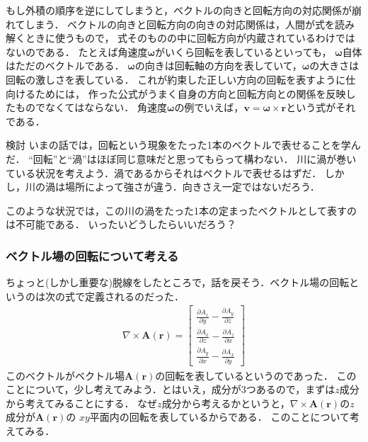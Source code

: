 もし外積の順序を逆にしてしまうと，ベクトルの向きと回転方向の対応関係が崩れてしまう．
ベクトルの向きと回転方向の向きの対応関係は，人間が式を読み解くときに使うもので，
式そのものの中に回転方向が内蔵されているわけではないのである．
たとえば角速度$\bm{\omega}$がいくら回転を表しているといっても，
$\bm{\omega}$自体はただのベクトルである．
$\bm{\omega}$の向きは回転軸の方向を表していて，$\bm{\omega}$の大きさは回転の激しさを表している．
これが約束した正しい方向の回転を表すように仕向けるためには，
作った公式がうまく自身の方向と回転方向との関係を反映したものでなくてはならない．
角速度$\bm{\omega}$の例でいえば，$\bm{v}=\bm{\omega}\times\bm{r}$という式がそれである．

\begin{itembox}[l]{検討}
いまの話では，回転という現象をたった1本のベクトルで表せることを学んだ．
``回転''と``渦''はほぼ同じ意味だと思ってもらって構わない．
川に渦が巻いている状況を考えよう．渦であるからそれはベクトルで表せるはずだ．
しかし，川の渦は場所によって強さが違う．向きさえ一定ではないだろう．

このような状況では，この川の渦をたった1本の定まったベクトルとして表すのは不可能である．
いったいどうしたらいいだろう？
\end{itembox}

\subsubsection{ベクトル場の回転について考える}
ちょっと(しかし重要な)脱線をしたところで，話を戻そう．ベクトル場の回転というのは次の式で定義されるのだった．
\begin{eqnarray}
\nabla \times \bm{A}(\bm{r}) = \left[
\begin{array}{c}
\displaystyle
\frac{\partial A_z}{\partial y} - \frac{\partial A_y}{\partial z} \\
\displaystyle
\frac{\partial A_x}{\partial z} - \frac{\partial A_z}{\partial x} \\
\displaystyle
\frac{\partial A_y}{\partial x} - \frac{\partial A_x}{\partial y} 
\end{array}
\right]
\label{eq:rotnabla2}
\end{eqnarray}
このベクトルがベクトル場$\bm{A}(\bm{r})$の回転を表しているというのであった．
このことについて，少し考えてみよう．とはいえ，成分が3つあるので，まずは$z$成分から考えてみることにする．
なぜ$z$成分から考えるかというと，$\nabla \times \bm{A}(\bm{r})$の$z$成分が$\bm{A}(\bm{r})$の
$xy$平面内の回転を表しているからである．
このことについて考えてみる．

